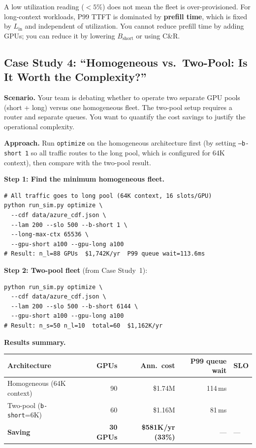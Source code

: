 \documentclass[11pt,a4paper]{article}
\newcommand{\Bshort}{B_{\text{short}}}
\begin{document}
\begin{warning}
  A low utilization reading ($< 5\%$) does not mean the fleet is
  over-provisioned.  For long-context workloads, P99 TTFT is dominated
  by \textbf{prefill time}, which is fixed by $L_{\text{in}}$ and
  independent of utilization.  You cannot reduce prefill time by
  adding GPUs; you can reduce it by lowering $\Bshort$ or using C\&R.
\end{warning}

\subsection{Case Study 4: ``Homogeneous vs.\ Two-Pool: Is It Worth the Complexity?''}
\label{sec:cs-savings}

\textbf{Scenario.}  Your team is debating whether to operate two
separate GPU pools (short + long) versus one homogeneous fleet.
The two-pool setup requires a router and separate queues.  You want
to quantify the cost savings to justify the operational complexity.

\textbf{Approach.}  Run \texttt{optimize} on the homogeneous
architecture first (by setting \texttt{--b-short 1} so all traffic
routes to the long pool, which is configured for 64K context),
then compare with the two-pool result.

\textbf{Step 1: Find the minimum homogeneous fleet.}
\begin{lstlisting}[style=shell]
# All traffic goes to long pool (64K context, 16 slots/GPU)
python run_sim.py optimize \
  --cdf data/azure_cdf.json \
  --lam 200 --slo 500 --b-short 1 \
  --long-max-ctx 65536 \
  --gpu-short a100 --gpu-long a100
# Result: n_l=88 GPUs  $1,742K/yr  P99 queue wait=113.6ms
\end{lstlisting}

\textbf{Step 2: Two-pool fleet} (from Case Study~1):
\begin{lstlisting}[style=shell]
python run_sim.py optimize \
  --cdf data/azure_cdf.json \
  --lam 200 --slo 500 --b-short 6144 \
  --gpu-short a100 --gpu-long a100
# Result: n_s=50 n_l=10  total=60  $1,162K/yr
\end{lstlisting}

\textbf{Results summary.}
\begin{center}
\begin{tabular}{lrrrl}
\toprule
Architecture & GPUs & Ann.\ cost & P99 queue wait & SLO \\
\midrule
Homogeneous (64K context)  & 90 & \$1.74M & 114\,ms & \checkmark \\
Two-pool (\texttt{b-short}=6K) & 60 & \$1.16M & 81\,ms & \checkmark \\
\midrule
\textbf{Saving} & \textbf{30 GPUs} & \textbf{\$581K/yr (33\%)} & --- & --- \\
\bottomrule
\end{tabular}
\end{center}
\end{document}
